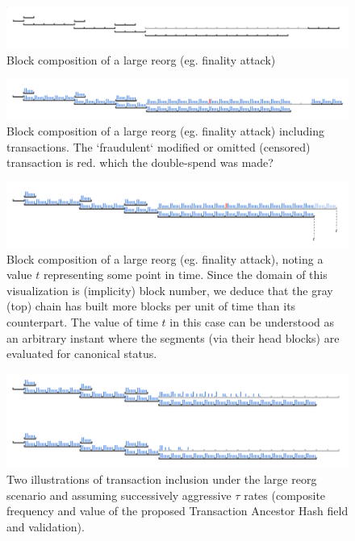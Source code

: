 \documentclass[11pt]{article}
\theoremstyle{plain}
\begin{document}
\begin{figure}[tph]
\centering
\includegraphics[width=1.0\textwidth]{vis_blocksegment_forking_reorg.png}
\caption{Block composition of a large reorg (eg. finality attack)}
\label{fig:blocksegment_forks_reorg}
\end{figure}

\begin{figure}[tph]
\centering
\includegraphics[width=1.0\textwidth]{vis_blocksegment_forking_reorg_txs.png}
\caption{Block composition of a large reorg (eg. finality attack) including
transactions.
  The `fraudulent` modified or omitted (censored) transaction is red.
which the double-spend was made?
}
\label{fig:blocksegment_forks_reorg_txs}
\end{figure}

\begin{figure}[tph]
\centering
\includegraphics[width=1.0\textwidth]{vis_blocksegment_forking_reorg_t.png}
\caption{Block composition of a large reorg (eg. finality attack), noting a
value $t$ representing some point in time.
Since the domain of this visualization is (implicity) block number, we deduce
that the gray (top) chain has built more blocks per unit of time than its
counterpart.
The value of time $t$ in this case can be understood as an arbitrary instant
where the segments (via their head blocks) are evaluated for canonical status.
}
\label{fig:blocksegment_forks_reorg__t}
\end{figure}

\begin{figure}[tph]
\centering
\includegraphics[width=1.0\textwidth]{vis_blocksegment_forking_reorg_anchash.png
}
\caption{Two illustrations of transaction inclusion under the large reorg
scenario and assuming successively aggressive $\tau$ rates (composite frequency
and value of the proposed Transaction Ancestor Hash field and validation).
}
\label{fig:blocksegment_forks_reorg_anchash}
\end{figure}
\end{document}
